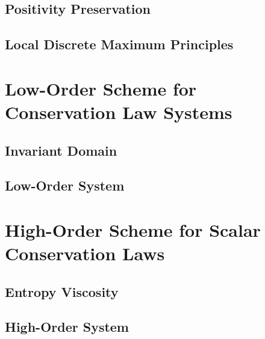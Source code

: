 \subsection{Positivity Preservation\label{sec:positivity_preservation}}
  
\subsection{Local Discrete Maximum Principles\label{sec:DMP}}
  
  
  
  
\section{Low-Order Scheme for Conservation Law Systems}\label{sec:low_order_system}

\subsection{Invariant Domain\label{sec:invariant_domain}}
  
\subsection{Low-Order System\label{sec:low_order_scheme_system}}
  
\section{High-Order Scheme for Scalar Conservation Laws
  \label{sec:high_order_scalar}}  

\subsection{Entropy Viscosity\label{sec:entropy_viscosity_scalar}}
    
\subsection{High-Order System\label{sec:high_order_scheme_scalar}}
  
